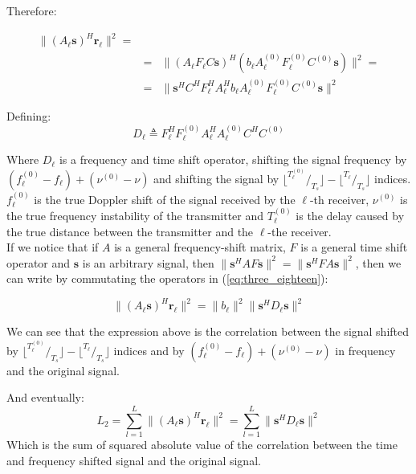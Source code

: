 Therefore:

\begin{eqnarray}
\label{eq:three_eighteen}
\|(A_\ell\mathbf{s})^H\mathbf{r_\ell}\|^2 =\\
&=&\|(A_\ell F_\ell C\mathbf{s})^H(b_\ell A_\ell^{(0)} F_\ell^{(0)} C^{(0)} \mathbf{s})\|^2= \nonumber \\
&=&\|\mathbf{s}^H C^H F_\ell^H A_\ell^H b_\ell A_\ell^{(0)} F_\ell^{(0)} C^{(0)} \mathbf{s}\|^2 \nonumber
\end{eqnarray}

Defining:
\begin{equation}
D_\ell \triangleq  F_\ell^H  F_\ell^{(0)} A_\ell^H A^{(0)}_\ell C^H C^{(0)}
\end{equation}

Where $D_\ell$ is a frequency and time shift operator, shifting the signal frequency by $(f^{(0)}_\ell-f_\ell)+(\nu^{(0)}-\nu)$ and shifting the signal by $\lfloor ^{T_\ell^{(0)}}/_{T_s} \rfloor- \lfloor ^{T_\ell}/_{T_s} \rfloor$ indices. $f^{(0)}_\ell$ is the true Doppler shift of the signal received by the $\ell$-th receiver, $\nu^{(0)}$ is the true frequency instability of the transmitter and $T_\ell^{(0)}$ is the delay caused by the true distance between the transmitter and the $\ell$-the receiver.
\\
If we notice that if $A$ is a general frequency-shift matrix, $F$ is a general time shift
operator and $\mathbf{s}$ is an arbitrary signal, then $\|\mathbf{s}^H AF \mathbf{s}\|^2=\|\mathbf{s}^H FA\mathbf{s}\|^2$,
then we can write by commutating the operators in (\ref{eq:three_eighteen}):

\begin{equation}
\|(A_\ell\mathbf{s})^H\mathbf{r_\ell}\|^2 = \|b_\ell\|^2\|\mathbf{s}^H D_\ell \mathbf{s}\|^2
\end{equation}

We can see that the expression above is the correlation between the signal shifted by $\lfloor ^{T_\ell^{(0)}}/_{T_s} \rfloor- \lfloor ^{T_\ell}/_{T_s} \rfloor$ indices and by $(f^{(0)}_\ell-f_\ell)+(\nu^{(0)}-\nu)$ in frequency and the original signal.

And eventually:
\begin{equation}
L_2 = \sum_{l=1}^L \|(A_\ell\mathbf{s})^H\mathbf{r_\ell}\|^2 = \sum_{l=1}^L \|\mathbf{s}^H D_\ell \mathbf{s}\|^2
\end{equation}
Which is the sum of squared absolute value of the correlation between the time and frequency shifted signal and the original signal.

